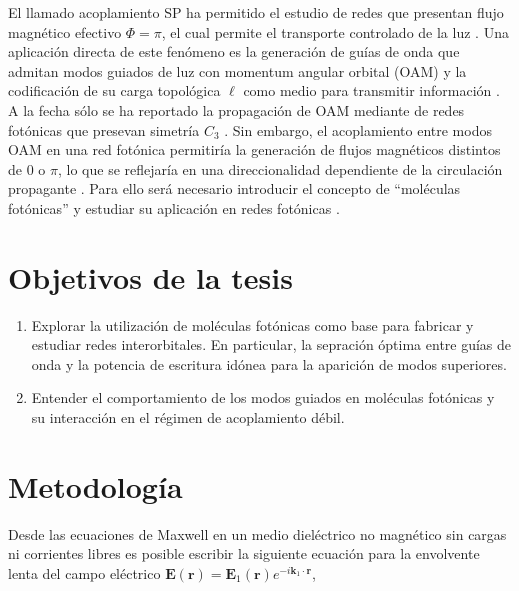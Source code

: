 \documentclass{article}
\begin{document}
	El llamado acoplamiento SP ha permitido el estudio de redes que presentan flujo magnético efectivo $\Phi = \pi$, el cual permite el transporte controlado de la luz \cite{OAMCaging, ABCaging}. Una aplicación directa de este fenómeno es la generación de guías de onda que admitan modos guiados de luz con momentum angular orbital (OAM) y la codificación de su carga topológica $\ell$ como medio para transmitir información \cite{oamapp, oamfree}. A la fecha sólo se ha reportado la propagación de OAM mediante de redes fotónicas que presevan simetría $C_3$ \cite{OAMWG, vortex}. Sin embargo, el acoplamiento entre modos OAM en una red fotónica permitiría la generación de flujos magnéticos distintos de $0$ o $\pi$, lo que se reflejaría en una direccionalidad dependiente de la circulación propagante \cite{vortextrim, topoOAM}. Para ello será necesario introducir el concepto de ``moléculas fotónicas'' \cite{molecules} y estudiar su aplicación en redes fotónicas \cite{SPSSH}.
\section{Objetivos de la tesis}
\begin{enumerate}
	\item Explorar la utilización de moléculas fotónicas como base para fabricar y estudiar redes interorbitales. En particular, la sepración óptima entre guías de onda y la potencia de escritura idónea para la aparición de modos superiores.
	\item Entender el comportamiento de los modos guiados en moléculas fotónicas y su interacción en el régimen de acoplamiento débil.
\end{enumerate}
\section{Metodología}

Desde las ecuaciones de Maxwell en un medio dieléctrico no magnético sin cargas ni corrientes libres es posible escribir la siguiente ecuación para la envolvente lenta del campo eléctrico $\textbf{E}(\textbf{r}) = \textbf{E}_1(\textbf{r}) e^{-i \textbf{k}_1 \cdot \textbf{r}}$,
\end{document}

